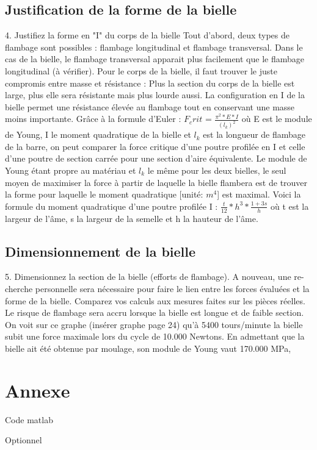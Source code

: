 \documentclass[a4paper,oneside,12pt]{report}
\begin{document}
\section{Justification de la forme de la bielle}
4. Justifiez la forme en "I" du corps de la bielle
Tout d'abord, deux types de flambage sont possibles : flambage longitudinal et flambage transversal. Dans le cas de la bielle, le flambage transversal apparait plus facilement que le flambage longitudinal (à vérifier). Pour le corps de la bielle, il faut trouver le juste compromis entre masse et résistance : Plus la section du corps de la bielle est large, plus elle sera résistante mais plus lourde aussi. La configuration en I de la bielle permet une résistance élevée au flambage tout en conservant une masse moins importante. Grâce à la formule d'Euler : $F_crit$ = $\frac{\pi^2 *E*I}{(l_k)^2}$ où E est le module de Young, I le moment quadratique de la bielle et $l_k$ est la longueur de flambage de la barre, on peut comparer la force critique d'une poutre profilée en I et celle d'une poutre de section carrée pour une section d'aire équivalente. Le module de Young étant propre au matériau et $l_k$ le même pour les deux bielles, le seul moyen de maximiser la force à partir de laquelle la bielle flambera est de trouver la forme pour laquelle le moment quadratique [unité: $m^4$] est maximal. Voici la formule du moment quadratique d'une poutre profilée I : $\frac{t}{12}*h^3 * \frac{1+3s}{h}$ où t est la largeur de l'âme, s la largeur de la semelle et h la hauteur de l'âme.\\
\section{Dimensionnement de la bielle}
5. Dimensionnez la section de la bielle (efforts de flambage). A nouveau, une re-
cherche personnelle sera nécessaire pour faire le lien entre les forces évaluées
et la forme de la bielle. Comparez vos calculs aux mesures faites sur les pièces
réelles.
Le risque de flambage sera accru lorsque la bielle est longue et de faible section.
On voit sur ce graphe (insérer graphe page 24) qu'à 5400 tours/minute la bielle subit une force maximale lors du cycle de 10.000 Newtons.
 En admettant que la bielle ait été obtenue par moulage, son module de Young vaut 170.000 MPa, 

\chapter{Annexe}
Code matlab

Optionnel
\end{document}
